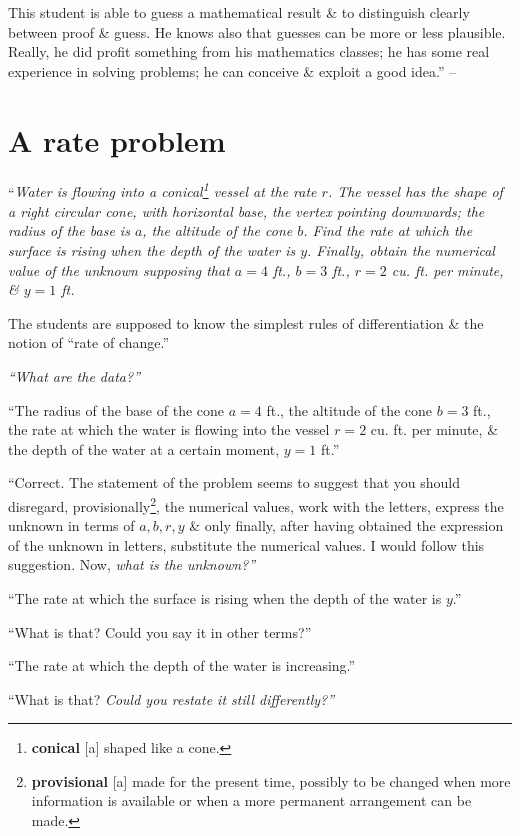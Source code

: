 \documentclass[oneside]{book}
\numberwithin{equation}{section}
\begin{document}
This student is able to guess a mathematical result \& to distinguish clearly between proof \& guess. He knows also that guesses can be more or less plausible. Really, he did profit something from his mathematics classes; he has some real experience in solving problems; he can conceive \& exploit a good idea.'' -- \cite[pp. 25--29]{Polya2014}

\section{A rate problem}
``\textit{Water is flowing into a conical\footnote{\textbf{conical} [a] shaped like a cone.} vessel at the rate $r$. The vessel has the shape of a right circular cone, with horizontal base, the vertex pointing downwards; the radius of the base is $a$, the altitude of the cone $b$. Find the rate at which the surface is rising when the depth of the water is $y$. Finally, obtain the numerical value of the unknown supposing that $a = 4$ ft., $b = 3$ ft., $r = 2$ cu. ft. per minute, \& $y = 1$ ft.}

The students are supposed to know the simplest rules of differentiation \& the notion of ``rate of change.''

\textit{``What are the data?''}

``The radius of the base of the cone $a = 4$ ft., the altitude of the cone $b = 3$ ft., the rate at which the water is flowing into the vessel $r = 2$ cu. ft. per minute, \& the depth of the water at a certain moment, $y = 1$ ft.''

``Correct. The statement of the problem seems to suggest that you should disregard, provisionally\footnote{\textbf{provisional} [a] made for the present time, possibly to be changed when more information is available or when a more permanent arrangement can be made.}, the numerical values, work with the letters, express the unknown in terms of $a,b,r,y$ \& only finally, after having obtained the expression of the unknown in letters, substitute the numerical values. I would follow this suggestion. Now, \textit{what is the unknown?''}

``The rate at which the surface is rising when the depth of the water is $y$.''

``What is that? Could you say it in other terms?''

``The rate at which the depth of the water is increasing.''

``What is that? \textit{Could you restate it still differently?''}
\end{document}
